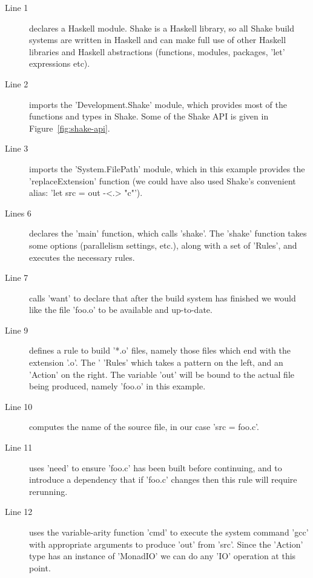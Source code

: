 \begin{description}
\item[Line 1] declares a Haskell module. Shake is a Haskell library, so all
Shake build systems are written in Haskell and can make full use of other
Haskell libraries and Haskell abstractions (functions, modules, packages,
\lst'let' expressions etc).
\item[Line 2] imports the \lst'Development.Shake' module, which provides most of
the functions and types in Shake. Some of the Shake API is given in
Figure~\ref{fig:shake-api}.
\item[Line 3] imports the \lst'System.FilePath' module, which in this example
provides the \lst'replaceExtension' function (we could have also used Shake's
convenient alias: \lst'let src = out -<.> "c"').
\item[Lines 6] declares the \lst'main' function, which calls \lst'shake'. The
\lst'shake' function takes some options (parallelism settings, etc.), along with
a set of \lst'Rules', and executes the necessary rules.
\item[Line 7] calls \lst'want' to declare that after the build system has
finished we would like the file \lst'foo.o' to be available and up-to-date.
\item[Line 9] defines a rule to build \lst'*.o' files, namely those files which
end with the extension \lst'.o'. The \lst'%
\lst'Rules' which takes a pattern on the left, and an \lst'Action' on the
right. The variable \lst'out' will be bound to the actual file being produced,
namely \lst'foo.o' in this example.
\item[Line 10] computes the name of the source file, in our case
\lst'src = foo.c'.
\item[Line 11] uses \lst'need' to ensure \lst'foo.c' has been built before
continuing, and to introduce a dependency that if \lst'foo.c' changes then this
rule will require rerunning.
\item[Line 12] uses the variable-arity function \lst'cmd' to execute the system
command \lst'gcc' with appropriate arguments to produce \lst'out' from
\lst'src'. Since the \lst'Action' type has an instance of \lst'MonadIO' we can
do any \lst'IO' operation at this point.
\end{description}

